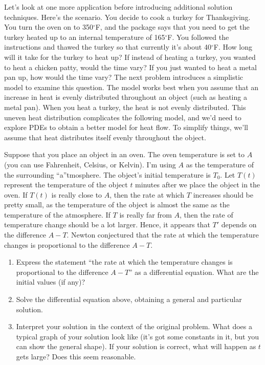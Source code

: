 Let's look at one more application before introducing additional solution techniques.  Here's the scenario.
You decide to cook a turkey for Thanksgiving. You turn the oven on to 350$^\circ$F, and the package says that you need to get the turkey heated up to an internal temperature of 165$^\circ$F.  You followed the instructions and thawed the turkey so that currently it's about 40$^\circ$F.  How long will it take for the turkey to heat up? If instead of heating a turkey, you wanted to heat a chicken patty, would the time vary?  If you just wanted to heat a metal pan up, how would the time vary? The next problem introduces a simplistic model to examine this question.  The model works best when you assume that an increase in heat is evenly distributed throughout an object (such as heating a metal pan). When you heat a turkey, the heat is not evenly distributed. This uneven heat distribution complicates the following model, and we'd need to explore PDEs to obtain a better model for heat flow.  To simplify things, we'll assume that heat distributes itself evenly throughout the object. 
\begin{problem}
 Suppose that you place an object in an oven.  The oven temperature is set to $A$ (you can use Fahrenheit, Celsius, or Kelvin). I'm using $A$ as the temperature of the surrounding ``a''tmosphere. The object's initial temperature is $T_0$.  Let $T(t)$ represent the temperature of the object $t$ minutes after we place the object in the oven. If $T(t)$ is really close to $A$, then the rate at which $T$ increases should be pretty small, as the temperature of the object is almost the same as the temperature of the atmosphere.  If $T$ is really far from $A$, then the rate of temperature change should be a lot larger.  Hence, it appears that $T'$ depends on the difference $A-T$.  Newton conjectured that the rate at which the temperature changes is proportional to the difference $A-T$.
\begin{enumerate}
 \item Express the statement ``the rate at which the temperature changes is proportional to the difference $A-T$'' as a differential equation. What are the initial values (if any)?
 \item Solve the differential equation above, obtaining a general and particular solution.
 \item Interpret your solution in the context of the original problem. What does a typical graph of your solution look like (it's got some constants in it, but you can show the general shape). If your solution is correct, what will happen as $t$ gets large? Does this seem reasonable.
\end{enumerate}
\end{problem}
 

